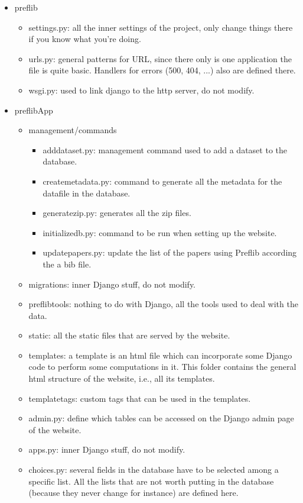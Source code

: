 \documentclass{report}
\begin{document}
	\begin{itemize}
		\item preflib
		\begin{itemize}
			\item settings.py: all the inner settings of the project, only change things there if you know what you're doing.
			\item urls.py: general patterns for URL, since there only is one application the file is quite basic. Handlers for errors (500, 404, ...) also are defined there.
			\item wsgi.py: used to link django to the http server, do not modify.
		\end{itemize}
		\item preflibApp
		\begin{itemize}
			\item management/commands
			\begin{itemize}
				\item adddataset.py: management command used to add a dataset to the database.
				\item createmetadata.py: command to generate all the metadata for the datafile in the database.
				\item generatezip.py: generates all the zip files.
				\item initializedb.py: command to be run when setting up the website.
				\item updatepapers.py: update the list of the papers using Preflib according the a bib file.
			\end{itemize}
			\item migrations: inner Django stuff, do not modify.
			\item preflibtools: nothing to do with Django, all the tools used to deal with the data.
			\item static: all the static files that are served by the website.
			\item templates: a template is an html file which can incorporate some Django code to perform some computations in it. This folder contains the general html structure of the website, i.e., all its templates.
			\item templatetags: custom tags that can be used in the templates.
			\item admin.py: define which tables can be accessed on the Django admin page of the website.
			\item apps.py: inner Django stuff, do not modify.
			\item choices.py: several fields in the database have to be selected among a specific list. All the lists that are not worth putting in the database (because they never change for instance) are defined here.

\end{itemize}
\end{itemize}
\end{document}
